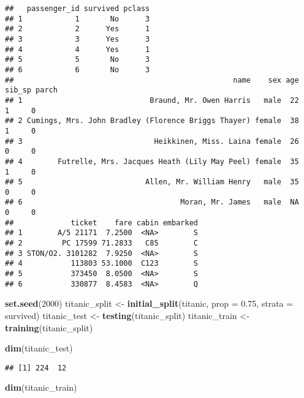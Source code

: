 \documentclass[]{article}
\newenvironment{Shaded}{\begin{snugshade}}{\end{snugshade}}
\newcommand{\DataTypeTok}[1]{\textcolor[rgb]{0.13,0.29,0.53}{#1}}
\newcommand{\DecValTok}[1]{\textcolor[rgb]{0.00,0.00,0.81}{#1}}
\newcommand{\FloatTok}[1]{\textcolor[rgb]{0.00,0.00,0.81}{#1}}
\newcommand{\KeywordTok}[1]{\textcolor[rgb]{0.13,0.29,0.53}{\textbf{#1}}}
\newcommand{\NormalTok}[1]{#1}
\newcommand{\StringTok}[1]{\textcolor[rgb]{0.31,0.60,0.02}{#1}}
\begin{document}
\begin{verbatim}
##   passenger_id survived pclass
## 1            1       No      3
## 2            2      Yes      1
## 3            3      Yes      3
## 4            4      Yes      1
## 5            5       No      3
## 6            6       No      3
##                                                  name    sex age sib_sp parch
## 1                             Braund, Mr. Owen Harris   male  22      1     0
## 2 Cumings, Mrs. John Bradley (Florence Briggs Thayer) female  38      1     0
## 3                              Heikkinen, Miss. Laina female  26      0     0
## 4        Futrelle, Mrs. Jacques Heath (Lily May Peel) female  35      1     0
## 5                            Allen, Mr. William Henry   male  35      0     0
## 6                                    Moran, Mr. James   male  NA      0     0
##             ticket    fare cabin embarked
## 1        A/5 21171  7.2500  <NA>        S
## 2         PC 17599 71.2833   C85        C
## 3 STON/O2. 3101282  7.9250  <NA>        S
## 4           113803 53.1000  C123        S
## 5           373450  8.0500  <NA>        S
## 6           330877  8.4583  <NA>        Q
\end{verbatim}

\begin{Shaded}
\begin{Highlighting}[]
\KeywordTok{set.seed}\NormalTok{(}\DecValTok{2000}\NormalTok{)}
\NormalTok{titanic_split <-}\StringTok{ }\KeywordTok{initial_split}\NormalTok{(titanic, }\DataTypeTok{prop =} \FloatTok{0.75}\NormalTok{, }\DataTypeTok{strata =}\NormalTok{ survived)}
\NormalTok{titanic_test <-}\StringTok{ }\KeywordTok{testing}\NormalTok{(titanic_split)}
\NormalTok{titanic_train <-}\StringTok{ }\KeywordTok{training}\NormalTok{(titanic_split)}
\end{Highlighting}
\end{Shaded}

\begin{Shaded}
\begin{Highlighting}[]
\KeywordTok{dim}\NormalTok{(titanic_test)}
\end{Highlighting}
\end{Shaded}

\begin{verbatim}
## [1] 224  12
\end{verbatim}

\begin{Shaded}
\begin{Highlighting}[]
\KeywordTok{dim}\NormalTok{(titanic_train)}
\end{Highlighting}
\end{Shaded}
\end{document}
